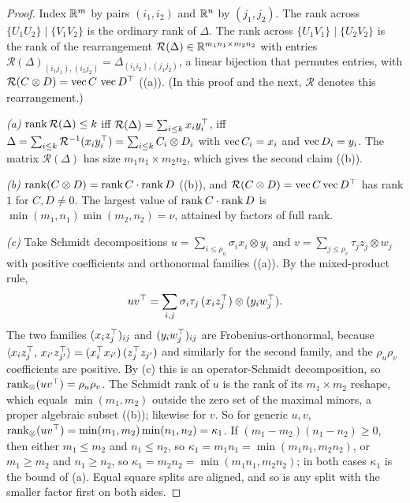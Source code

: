 
\begin{proof}
Index $\mathbb{R}^m$ by pairs $(i_1,i_2)$ and $\mathbb{R}^n$ by $(j_1,j_2)$. The rank across $\{U_1U_2\}\mid\{V_1V_2\}$ is the ordinary
rank of $\Delta$. The rank across $\{U_1V_1\}\mid\{U_2V_2\}$ is the rank of the rearrangement
$\mathcal R(\Delta)\in\mathbb{R}^{m_1n_1\times m_2n_2}$ with entries $\mathcal R(\Delta)_{(i_1j_1),(i_2j_2)}=\Delta_{(i_1i_2),(j_1j_2)}$,
a linear bijection that permutes entries, with $\mathcal R(C\otimes D)=\operatorname{vec} C\,\operatorname{vec} D^{\top}$ ((a)). (In this
proof and the next, $\mathcal R$ denotes this rearrangement.)

\emph{(a)} $\operatorname{rank}\mathcal R(\Delta)\le k$ iff $\mathcal R(\Delta)=\sum_{i\le k}x_iy_i^{\top}$, iff
$\Delta=\sum_{i\le k}\mathcal R^{-1}(x_iy_i^{\top})=\sum_{i\le k}C_i\otimes D_i$ with $\operatorname{vec} C_i=x_i$ and $\operatorname{vec} D_i=y_i$. The
matrix $\mathcal R(\Delta)$ has size $m_1n_1\times m_2n_2$, which gives the second claim ((b)).

\emph{(b)} $\operatorname{rank}(C\otimes D)=\operatorname{rank} C\cdot\operatorname{rank} D$ ((b)), and $\mathcal R(C\otimes D)=\operatorname{vec} C\operatorname{vec} D^{\top}$ has rank $1$
for $C,D\ne0$. The largest value of $\operatorname{rank} C\cdot\operatorname{rank} D$ is $\min(m_1,n_1)\min(m_2,n_2)=\nu$, attained by factors of full rank.

\emph{(c)} Take Schmidt decompositions $u=\sum_{i\le\rho_u}\sigma_ix_i\otimes y_i$ and
$v=\sum_{j\le\rho_v}\tau_jz_j\otimes w_j$ with positive coefficients and orthonormal families ((a)). By the
mixed-product rule,
\begin{equation*}
  uv^{\top}=\sum_{i,j}\sigma_i\tau_j\,(x_iz_j^{\top})\otimes(y_iw_j^{\top}).
\end{equation*}
The two families $(x_iz_j^{\top})_{ij}$ and $(y_iw_j^{\top})_{ij}$ are Frobenius-orthonormal, because
$\langle x_iz_j^{\top},\,x_{i'}z_{j'}^{\top}\rangle=(x_i^{\top} x_{i'})\,(z_j^{\top} z_{j'})$ and similarly for the second family, and the
$\rho_u\rho_v$ coefficients are positive. By
(c) this is an operator-Schmidt decomposition, so $\operatorname{rank}_\otimes(uv^{\top})=\rho_u\rho_v$. The Schmidt rank of $u$ is the
rank of its $m_1\times m_2$ reshape, which equals $\min(m_1,m_2)$ outside the zero set of the maximal minors, a proper
algebraic subset ((b)); likewise for $v$. So for generic $u,v$, $\operatorname{rank}_\otimes(uv^{\top})=\min(m_1,m_2)\min(n_1,n_2)=
\kappa_1$. If $(m_1-m_2)(n_1-n_2)\ge0$, then either $m_1\le m_2$ and $n_1\le n_2$, so $\kappa_1=m_1n_1=\min(m_1n_1,m_2n_2)$,
or $m_1\ge m_2$ and $n_1\ge n_2$, so $\kappa_1=m_2n_2=\min(m_1n_1,m_2n_2)$; in both cases $\kappa_1$ is the bound of (a).
Equal square splits are aligned, and so is any split with the smaller factor first on both sides.


\end{proof}
